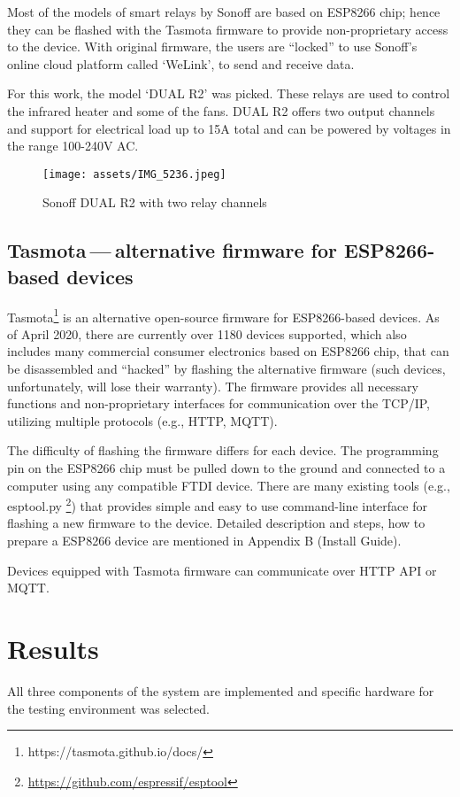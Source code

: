 Most of the models of smart relays by Sonoff are based on ESP8266 chip;
hence they can be flashed with the Tasmota firmware to provide non-proprietary
access to the device. With original firmware, the users are ``locked'' to use
Sonoff’s online cloud platform called `WeLink', to send and receive data.


For this work, the model `DUAL R2' was picked. These relays are used to
control the infrared heater and some of the fans. DUAL R2 offers two output
channels and support for electrical load up to 15A total and can be powered
by voltages in the range 100-240V AC.


\begin{figure}[h]{}
\centering\texttt{[image: assets/IMG\_5236.jpeg]}
\caption{Sonoff DUAL R2 with two relay channels}

\end{figure}

\hypertarget{x-tasmota — alternative-firmware-for-esp8266-based-devices}{\subsection{Tasmota — alternative firmware for ESP8266-based devices}}
Tasmota\footnote{https://tasmota.github.io/docs/} is an alternative open-source 
firmware for ESP8266-based devices.
As of April 2020, there are currently over 1180 devices supported\cite{tasdirec},
which also includes many commercial consumer electronics based on ESP8266 chip,
that can be disassembled and ``hacked'' by flashing the alternative firmware
(such devices, unfortunately, will lose their warranty).
The firmware provides all necessary functions and non-proprietary
interfaces for communication over the TCP/IP, utilizing multiple protocols
(e.g., HTTP, MQTT).


The difficulty of flashing the firmware differs for each device. The programming pin
on the ESP8266 chip must be pulled down to the ground and connected to a computer using
any compatible FTDI device. There are many existing tools (e.g., esptool.py
\footnote{\href{https://github.com/espressif/esptool}{https://github.com/espressif/esptool}})
that provides simple and easy to use command-line
interface for flashing a new firmware to the device. Detailed description and
steps, how to prepare a ESP8266 device are mentioned in Appendix B (Install Guide).

Devices equipped with Tasmota firmware can communicate over HTTP API or MQTT.

\hypertarget{x-results}{\section{Results}}
All three components of the system are implemented and specific hardware
for the testing environment was selected.


